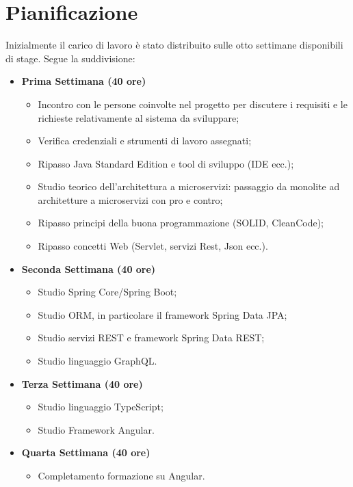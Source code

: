 \section{Pianificazione}
\label{pianificazione}
Inizialmente il carico di lavoro è stato distribuito sulle otto settimane disponibili di stage. Segue la suddivisione:
\begin{itemize}
    \item \textbf{Prima Settimana (40 ore)}
    \begin{itemize}
        \item Incontro con le persone coinvolte nel progetto per discutere i requisiti e le richieste relativamente al sistema da sviluppare;
        \item Verifica credenziali e strumenti di lavoro assegnati;
        \item Ripasso Java Standard Edition e tool di sviluppo (IDE ecc.);
        \item Studio teorico dell’architettura a microservizi: passaggio da monolite ad architetture a microservizi con pro e contro;
        \item Ripasso principi della buona programmazione (SOLID, CleanCode);
        \item Ripasso concetti Web (Servlet, servizi Rest, Json ecc.).
    \end{itemize}
    \item \textbf{Seconda Settimana (40 ore)}
    \begin{itemize}
        \item Studio Spring Core/Spring Boot;
        \item Studio ORM, in particolare il framework Spring Data JPA;
        \item Studio servizi REST e framework Spring Data REST;
        \item Studio linguaggio GraphQL.
    \end{itemize}
    \item \textbf{Terza Settimana (40 ore)}
    \begin{itemize}
        \item Studio linguaggio TypeScript;
        \item Studio Framework Angular.
    \end{itemize}
    \item \textbf{Quarta Settimana (40 ore)}
    \begin{itemize}
        \item Completamento formazione su Angular.
    \end{itemize}

\end{itemize}
